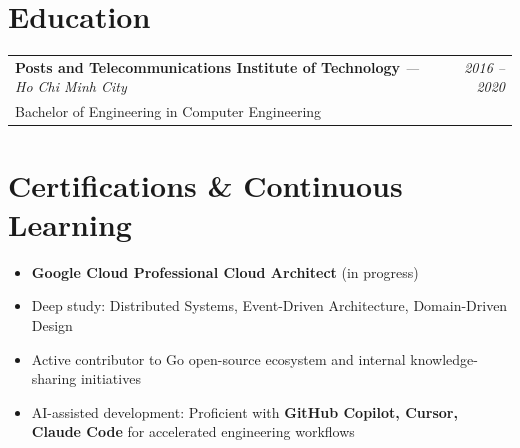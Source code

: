 \documentclass[a4paper,11pt]{article}
\newcommand{\resumeSubheading}[4]{
  \vspace{-1pt}
  \begin{tabularx}{\textwidth}{X r}
    \textbf{#1} \textit{\small --- #2} & \textit{\small #3} \\
    \small #4 & \\
  \end{tabularx}\vspace{-6pt}
}
\newcommand{\resumeItemListStart}{\begin{itemize}[leftmargin=0.2in, label=\textbullet, itemsep=1pt, parsep=0pt]}
\newcommand{\resumeItemListEnd}{\end{itemize}\vspace{-4pt}}
\newcommand{\resumeItem}[1]{\item\small{#1}}
\begin{document}
\section{Education}

\resumeSubheading
  {Posts and Telecommunications Institute of Technology}{Ho Chi Minh City}{2016 -- 2020}
  {Bachelor of Engineering in Computer Engineering}

\section{Certifications \& Continuous Learning}
\resumeItemListStart
  \resumeItem{\textbf{Google Cloud Professional Cloud Architect} (in progress)}
  \resumeItem{Deep study: Distributed Systems, Event-Driven Architecture, Domain-Driven Design}
  \resumeItem{Active contributor to Go open-source ecosystem and internal knowledge-sharing initiatives}
  \resumeItem{AI-assisted development: Proficient with \textbf{GitHub Copilot, Cursor, Claude Code} for accelerated engineering workflows}
\resumeItemListEnd
\end{document}
